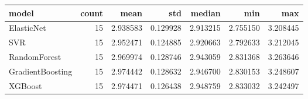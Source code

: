 \begin{tabular}{lrrrrrr}
\toprule
model & count & mean & std & median & min & max \\
\midrule
ElasticNet & 15 & 2.938583 & 0.129928 & 2.913215 & 2.755150 & 3.208445 \\
SVR & 15 & 2.952471 & 0.124885 & 2.920663 & 2.792633 & 3.212045 \\
RandomForest & 15 & 2.969974 & 0.128746 & 2.943059 & 2.831368 & 3.263646 \\
GradientBoosting & 15 & 2.974442 & 0.128632 & 2.946700 & 2.830153 & 3.248607 \\
XGBoost & 15 & 2.974471 & 0.126438 & 2.948759 & 2.833032 & 3.242497 \\
\bottomrule
\end{tabular}
